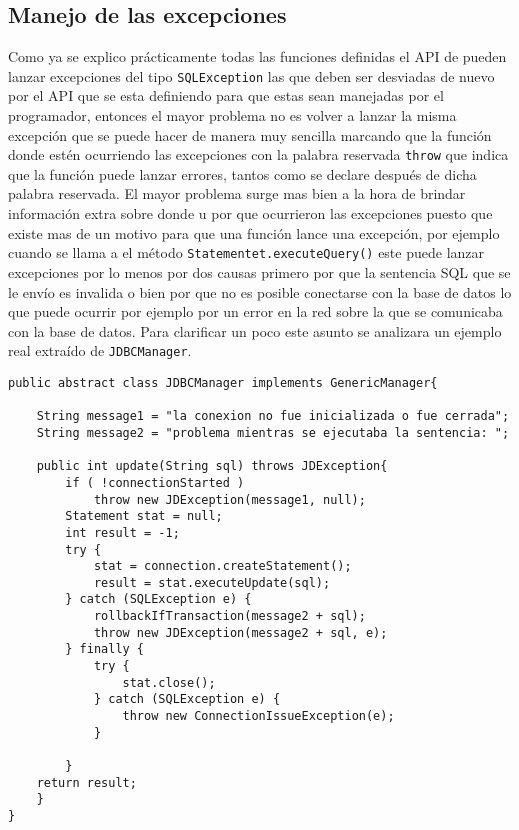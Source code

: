 \subsection{Manejo de las excepciones}
Como ya se explico prácticamente todas las funciones definidas el API de \jd pueden lanzar excepciones del tipo \verb=SQLException= las que deben ser desviadas de nuevo por el API que se esta definiendo para que estas sean manejadas por el programador, entonces el mayor problema   no es volver a lanzar la misma excepción que se puede hacer de manera muy sencilla marcando que la función donde estén ocurriendo las excepciones con la palabra reservada \verb=throw= que indica que la función puede lanzar errores, tantos como se declare después de dicha palabra reservada. El mayor problema surge mas bien a la hora de brindar información extra sobre donde u por que ocurrieron las excepciones puesto que existe mas de un motivo para que una función lance una excepción, por ejemplo cuando se llama a el método \verb=Statementet.executeQuery()= este puede lanzar excepciones por lo menos por dos causas primero por que la sentencia SQL que se le envío es invalida o bien por que no es posible conectarse con la base de datos lo que puede ocurrir por ejemplo por un error en la red sobre la que se comunicaba con la base de datos. Para clarificar un poco este asunto se analizara un ejemplo real extraído de \verb=JDBCManager=.
%
\begin{lstlisting}[title=función extraída de JDBCManager]
public abstract class JDBCManager implements GenericManager{

	String message1 = "la conexion no fue inicializada o fue cerrada";
	String message2 = "problema mientras se ejecutaba la sentencia: ";
	
	public int update(String sql) throws JDException{
		if ( !connectionStarted ) 
			throw new JDException(message1, null);
		Statement stat = null;
		int result = -1;
		try {
			stat = connection.createStatement();
			result = stat.executeUpdate(sql);
		} catch (SQLException e) {
			rollbackIfTransaction(message2 + sql);
			throw new JDException(message2 + sql, e);
		} finally {
			try {
				stat.close();
			} catch (SQLException e) {
				throw new ConnectionIssueException(e);
			}
			
		}
	return result; 
	}
}
\end{lstlisting}
%
